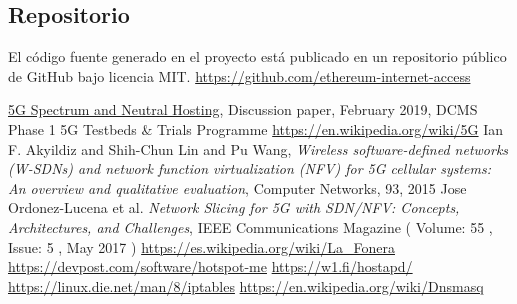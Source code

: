 \documentclass[12pt]{amsart}
\begin{document}
\begin{multicols}{2}
\section{Repositorio}\label{sec:repository}
El código fuente generado en el proyecto está publicado en un repositorio público de GitHub bajo licencia MIT.
\newline\newline
\url{https://github.com/ethereum-internet-access}
\newline
\begin{thebibliography}{9}
  \href{https://uk5g.org/media/uploads/resource_files/Spectrum\_NH\_discussion\_paper\_20Feb19.pdf}{5G Spectrum and Neutral Hosting}, Discussion paper, February 2019,
  DCMS Phase 1 5G Testbeds \& Trials Programme
 \href{https://en.wikipedia.org/wiki/5G}{https://en.wikipedia.org/wiki/5G}
 Ian F. Akyildiz and Shih-Chun Lin and Pu Wang,
  \textit{Wireless software-defined networks (W-SDNs) and network function virtualization (NFV) for 5G cellular systems:
    An overview and qualitative evaluation}, Computer Networks, 93, 2015
 Jose Ordonez-Lucena et al.
  \textit{Network Slicing for 5G with SDN/NFV: Concepts, Architectures, and Challenges},
   IEEE Communications Magazine ( Volume: 55 , Issue: 5 , May 2017 )
 \href{https://es.wikipedia.org/wiki/La_Fonera}{https://es.wikipedia.org/wiki/La\_Fonera}
 \href{https://devpost.com/software/hotspot-me}{https://devpost.com/software/hotspot-me}
 \href{https://w1.fi/hostapd/}{https://w1.fi/hostapd/}
 \href{https://linux.die.net/man/8/iptables}{https://linux.die.net/man/8/iptables}
 \href{https://en.wikipedia.org/wiki/Dnsmasq}{https://en.wikipedia.org/wiki/Dnsmasq}



\end{thebibliography}
\end{multicols}
\end{document}
